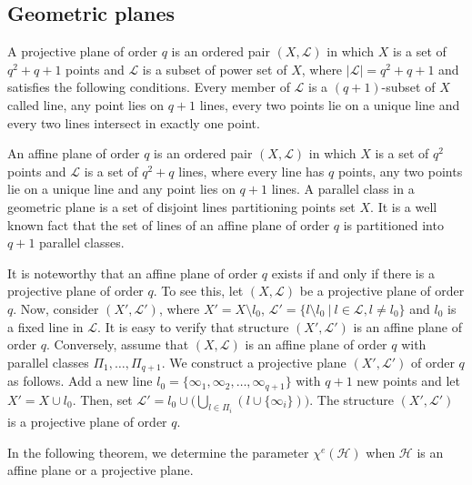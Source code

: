 \documentclass[12pt,a4paper]{article}
\begin{document}
\subsection{Geometric planes}
A projective plane of order $q$  is an ordered pair  $(X,\mathcal{L})$  in which  $X$ is  a set of $q^2+q+1$ points and $\mathcal{L}$  is a subset of power set of $  X $, where  $|\mathcal{L}|=q^2+q+1$ and satisfies the following conditions. Every member of $\mathcal{L}$ is a $(q+1)$-subset of $X$  called line, any point lies on $q + 1$ lines, every two points lie on a unique line and every two lines intersect in exactly one point.

An affine plane of order $q$ is an ordered pair  $(X,\mathcal{L})$  in which $X$ is  a set of   $q^2$ points  and $\mathcal{L}$  is a set of $q^2 + q$ lines, where
every line has $q$ points, any two points lie on a unique line and any point lies on $q + 1$ lines.
A parallel class in a geometric plane  is a  set of disjoint lines  partitioning  points set $X$.
It is a well known fact  that the set of lines of an affine plane of order $ q $ is partitioned into  $ q+1 $ parallel classes.

It is noteworthy that an affine plane of order $q$ exists if and only if  there is a projective plane of order $q$.
To see this, let $(X,\mathcal{L})$ be a projective plane of order
$q$. Now, consider  $(X',\mathcal{L}')$, where $X' =
X \setminus l_0$, $\mathcal{L}'= \{l \setminus {l}_0\ |\ l \in \mathcal{L}, l \neq l_0 \}$ and   $l_0$ is a fixed line in $ \mathcal{L}$. It is easy to verify that structure $(X',\mathcal{L}')$ is an affine plane of order
$q$.
Conversely, assume that $(X,\mathcal{L})$ is an affine plane of order
$q$ with parallel classes $ \Pi_1,\ldots,\Pi_{q+1} $. We construct a projective plane $(X',\mathcal{L}')$ of order $q$  as follows. Add a new line $l_0=\{\infty_{1}, \infty_{2}, \ldots, \infty_{q+1}\}$ with $ q+1 $ new points and let $X'= X \cup l_0 $. Then, set $\mathcal{L}'=l_0\cup\big(\bigcup_{l\in \Pi_i} (l\cup \{ \infty_i \})\big) $. The structure $(X',\mathcal{L}')$  is a projective plane of order $q$.

In the following theorem, we determine the parameter $\chi^e(\mathcal{H})$ when $\mathcal{H}$ is an affine plane or a projective plane.
\end{document}

